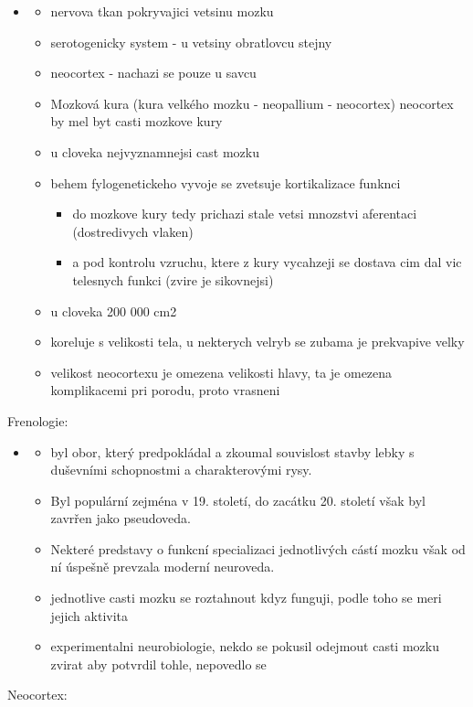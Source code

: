 \documentclass[journal,onecolumn]{IEEEtrancz}
\begin{document}
\begin{itemize}
	\item 
	\begin{itemize}
		\item nervova tkan pokryvajici vetsinu mozku
		\item serotogenicky system - u vetsiny obratlovcu stejny
		\item neocortex - nachazi se pouze u savcu
		\item Mozková kura (kura velkého mozku - neopallium - neocortex) neocortex by mel byt casti mozkove kury
		\item u cloveka nejvyznamnejsi cast mozku
		\item behem fylogenetickeho vyvoje se zvetsuje kortikalizace funknci
		\begin{itemize}
			\item do mozkove kury tedy prichazi stale vetsi mnozstvi aferentaci (dostredivych vlaken)
			\item a pod kontrolu vzruchu, ktere z kury vycahzeji se dostava cim dal vic telesnych funkci (zvire je sikovnejsi)
				\vspace{3mm}
		\end{itemize}

		\item u cloveka 200 000 cm2
		\item koreluje s velikosti tela, u nekterych velryb se zubama je prekvapive velky
			\vspace{3mm}
		\item velikost neocortexu je omezena velikosti hlavy, ta je omezena komplikacemi pri porodu, proto vrasneni
			\vspace{3mm}
			\vspace{3mm}
	\end{itemize}
\end{itemize}
Frenologie:
\begin{itemize}
	\item 
	\begin{itemize}
		\item byl obor, který predpokládal a zkoumal souvislost stavby lebky s duševními schopnostmi a charakterovými rysy. 
		\item Byl populární zejména v 19. století, do zacátku 20. století však byl zavrřen jako pseudoveda. 
		\item Nekteré predstavy o funkcní specializaci jednotlivých cástí mozku však od ní úspešně prevzala moderní neuroveda. 
		\item jednotlive casti mozku se roztahnout kdyz funguji, podle toho se meri jejich aktivita
			\vspace{3mm}
		\item experimentalni neurobiologie, nekdo se pokusil odejmout casti mozku zvirat aby potvrdil tohle, nepovedlo se
			\vspace{3mm}
	\end{itemize}
\end{itemize}
Neocortex:
\end{document}
